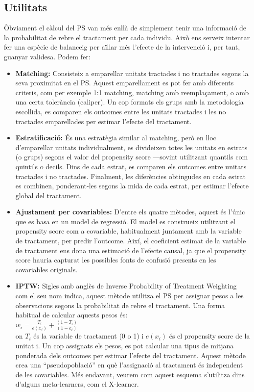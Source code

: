\documentclass[../main.tex]{subfiles}
\begin{document}
    \subsection{Utilitats}\label{subsec_ps:utilitat}
    Òbviament el càlcul del PS van més enllà de simplement tenir una informació de la probabilitat de rebre el tractament per cada individu. Això ens serveix intentar fer una espècie de balanceig per aïllar més l’efecte de la intervenció i, per tant, guanyar validesa. Podem fer: \citep{austin2011}
    \begin{itemize}
        \item \textbf{Matching:} Consisteix a emparellar unitats tractades i no tractades segons la seva proximitat en el PS. Aquest emparellament es pot fer amb diferents criteris, com per exemple 1:1 matching, matching amb reemplaçament, o amb una certa tolerància (caliper). Un cop formats els grups amb la metodologia escollida, es comparen els outcomes entre les unitats tractades i les no tractades emparellades per estimar l'efecte del tractament.
        \item \textbf{Estratificació:} És una estratègia similar al matching, però en lloc d’emparellar unitats individualment, es divideixen totes les unitats en estrats (o grups) segons el valor del propensity score —sovint utilitzant quantils com quintils o decils. Dins de cada estrat, es comparen els outcomes entre unitats tractades i no tractades. Finalment, les diferències obtingudes en cada estrat es combinen, ponderant-les segons la mida de cada estrat, per estimar l’efecte global del tractament.
        \item \textbf{Ajustament per covariables:} D’entre els quatre mètodes, aquest és l’únic que es basa en un model de regressió. El model es construeix utilitzant el propensity score com a covariable, habitualment juntament amb la variable de tractament, per predir l’outcome. Així, el coeficient estimat de la variable de tractament ens dona una estimació de l’efecte causal, ja que el propensity score hauria capturat les possibles fonts de confusió presents en les covariables originals.
        \item \textbf{IPTW:} Sigles amb anglès de Inverse Probability of Treatment Weighting com el seu nom indica, aquest mètode utilitza el PS per assignar pesos a les observacions segons la probabilitat de rebre el tractament. Una forma habitual de calcular aquests pesos és:\\
        $w_i=\frac{T_i}{e(x_i)}+\frac{(1-T_i)}{(1-e_i)}$\\
        on $T_i$ és la variable de tractament (0 o 1) i $e(x_i)$ és el propensity score de la unitat i. Un cop assignats els pesos, es pot calcular una tipus de mitjana ponderada dels outcomes per estimar l’efecte del tractament. Aquest mètode crea una “pseudopoblació” en què l’assignació al tractament és independent de les covariables. Més endavant, veurem com aquest esquema s'utilitza dins d’alguns meta-learners, com el X-learner.
    \end{itemize}
\end{document}
